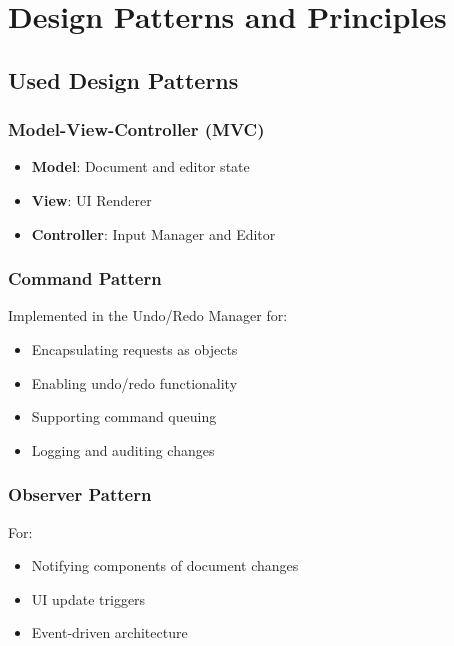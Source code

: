 \documentclass[12pt,a4paper,oneside,openany]{report}
\begin{document}
\chapter{Design Patterns and Principles}

\section{Used Design Patterns}

\subsection{Model-View-Controller (MVC)}

\begin{itemize}
	\item \textbf{Model}: Document and editor state
	\item \textbf{View}: UI Renderer
	\item \textbf{Controller}: Input Manager and Editor
\end{itemize}

\subsection{Command Pattern}

Implemented in the Undo/Redo Manager for:

\begin{itemize}
	\item Encapsulating requests as objects
	\item Enabling undo/redo functionality
	\item Supporting command queuing
	\item Logging and auditing changes
\end{itemize}

\subsection{Observer Pattern}

For:

\begin{itemize}
	\item Notifying components of document changes
	\item UI update triggers
	\item Event-driven architecture
\end{itemize}
\end{document}
